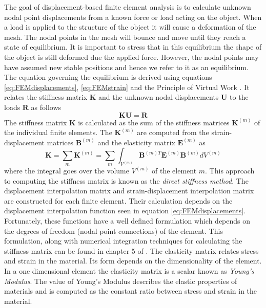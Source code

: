 \documentclass[11pt,a4paper,twoside]{report}
\begin{document}
The goal of displacement-based finite element analysis is to calculate
unknown nodal point displacements from a known force or load acting on the
object. When a load is applied to the structure of the object it will cause a
deformation of the mesh. The nodal points in the mesh will bounce and move
until they reach a state of equilibrium. It is important to stress that in this equilibrium the shape of the
object is still deformed due the applied force. However, the nodal points may have
assumed new stable positions and hence we refer to it as an equilibrium. The
equation governing the equilibrium is derived using equations
\ref{eq:FEMdisplacements}, \ref{eq:FEMstrain} and the Principle of Virtual
Work \cite{FEMbook}. It relates the stiffness matrix $\mathbf{K}$ and the unknown nodal
displacements $\mathbf{U}$ to the loads $\mathbf{R}$ as follows
\begin{equation}\label{eq:FEMequilibrium}
\mathbf{K}\mathbf{U} = \mathbf{R}
\end{equation}
The stiffness matrix $\mathbf{K}$ is calculated as the sum of the stiffness
matrices $\mathbf{K}^{(m)}$ of the individual finite elements. The
$\mathbf{K}^{(m)}$ are
computed from the strain-displacement matrices $\mathbf{B}^{(m)}$ and the
elasticity matrix $\mathbf{E}^{(m)}$ as
\begin{equation}\label{eq:FEMstiffness}
\mathbf{K} = \sum_m \mathbf{K}^{(m)} = \sum_m \int_{V^{(m)}} \mathbf{B}^{(m)T}
  \mathbf{E}^{(m)} \mathbf{B}^{(m)} dV^{(m)}
\end{equation}
where the integral goes over the volume $V^{(m)}$ of the element $m$. This
approach to computing the stiffness matrix is known as the \textit{direct
  stiffness method}. The displacement interpolation matrix and strain-displacement
interpolation matrix are constructed for each finite element. Their calculation
depends on the displacement interpolation function seen in equation
\ref{eq:FEMdisplacements}. Fortunately, these functions have a well defined
formulation which depends on the degrees of freedom (nodal point connections) of
the element. This formulation, along with numerical integration techniques for
calculating the stiffness matrix can be found in chapter 5 of \cite{FEMbook}. The elasticity matrix relates stress and
strain in the material. Its form depends on the dimensionality of the
element. In a one dimensional element the elasticity matrix is a scalar known as
\textit{Young's Modulus}. The value of Young's Modulus describes the elastic
properties of materials and is computed as the constant ratio between stress and strain
in the material.
\end{document}
